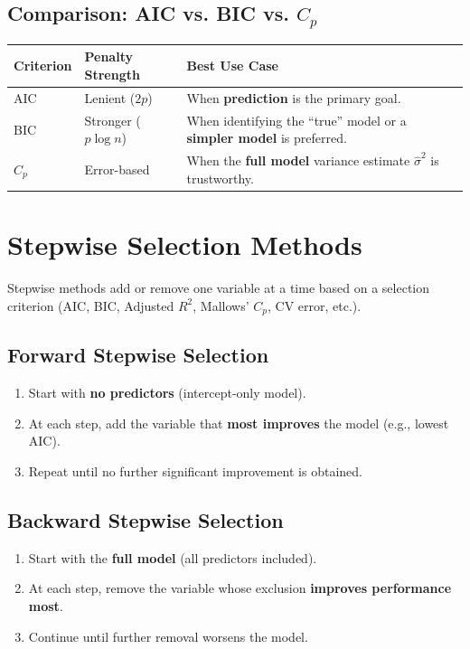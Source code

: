 \documentclass{article}
\begin{document}
\subsection{Comparison: AIC vs. BIC vs. $C_p$}
\begin{table}[h]
\centering
\small
\begin{tabularx}{\textwidth}{>{\raggedright\arraybackslash}p{}
                            >{\raggedright\arraybackslash}p{}
                            >{\raggedright\arraybackslash}X}
\toprule
\textbf{Criterion} & \textbf{Penalty Strength} & \textbf{Best Use Case} \\ 
\midrule
AIC & Lenient ($2p$) & When \textbf{prediction} is the primary goal. \\
BIC & Stronger ($p \log n$) & When identifying the ``true'' model or a \textbf{simpler model} is preferred. \\
$C_p$ & Error-based & When the \textbf{full model} variance estimate $\hat{\sigma}^2$ is trustworthy. \\
\bottomrule
\end{tabularx}
\end{table}

\newpage
\section{Stepwise Selection Methods}

Stepwise methods add or remove one variable at a time based on a selection criterion (AIC, BIC, Adjusted $R^2$, Mallows' $C_p$, CV error, etc.).

\subsection{Forward Stepwise Selection}
\begin{enumerate}
    \item Start with \textbf{no predictors} (intercept-only model).
    \item At each step, add the variable that \textbf{most improves} the model (e.g., lowest AIC).
    \item Repeat until no further significant improvement is obtained.
\end{enumerate}

\subsection{Backward Stepwise Selection}
\begin{enumerate}
    \item Start with the \textbf{full model} (all predictors included).
    \item At each step, remove the variable whose exclusion \textbf{improves performance most}.
    \item Continue until further removal worsens the model.
\end{enumerate}
\end{document}
